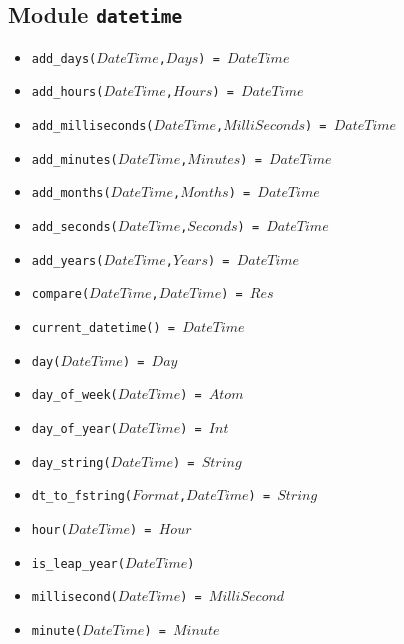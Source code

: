 \documentclass[10pt]{article}
\begin{document}
\begin{multicols}{2}
{\section*{Module \texttt{datetime}}
\begin{scriptsize}
\begin{itemize}
    \item \texttt{add\_days($DateTime$,$Days$) = $DateTime$}
    \item \texttt{add\_hours($DateTime$,$Hours$) = $DateTime$}
    \item \texttt{add\_milliseconds($DateTime$,$MilliSeconds$) = $DateTime$}
    \item \texttt{add\_minutes($DateTime$,$Minutes$) = $DateTime$}
    \item \texttt{add\_months($DateTime$,$Months$) = $DateTime$}
    \item \texttt{add\_seconds($DateTime$,$Seconds$) = $DateTime$}
    \item \texttt{add\_years($DateTime$,$Years$) = $DateTime$}
    \item \texttt{compare($DateTime$,$DateTime$) = $Res$}
    \item \texttt{current\_datetime() = $DateTime$}
    \item \texttt{day($DateTime$) = $Day$}
    \item \texttt{day\_of\_week($DateTime$) = $Atom$}
    \item \texttt{day\_of\_year($DateTime$) = $Int$}
    \item \texttt{day\_string($DateTime$) = $String$}
    \item \texttt{dt\_to\_fstring($Format$,$DateTime$) = $String$}
    \item \texttt{hour($DateTime$) = $Hour$}
    \item \texttt{is\_leap\_year($DateTime$)}
    \item \texttt{millisecond($DateTime$) = $MilliSecond$}
    \item \texttt{minute($DateTime$) = $Minute$}

\end{itemize}
\end{scriptsize}}
\end{multicols}
\end{document}
